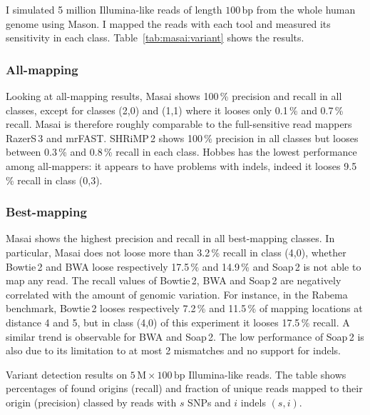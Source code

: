 I simulated 5 million Illumina-like reads of length $100$\,bp from the whole human genome using Mason.
I mapped the reads with each tool and measured its sensitivity in each class.
Table~\ref{tab:masai:variant} shows the results.

\subsubsection{All-mapping}

Looking at all-mapping results, Masai shows 100\,\% precision and recall in all classes, except for classes (2,0) and (1,1) where it looses only 0.1\,\% and 0.7\,\% recall.
Masai is therefore roughly comparable to the full-sensitive read mappers RazerS\,3 and mrFAST.
SHRiMP\,2 shows 100\,\% precision in all classes but looses between 0.3\,\% and 0.8\,\% recall in each class.
Hobbes has the lowest performance among all-mappers: it appears to have problems with indels, indeed it looses 9.5\,\% recall in class (0,3).

\subsubsection{Best-mapping}

Masai shows the highest precision and recall in all best-mapping classes.
In particular, Masai does not loose more than 3.2\,\% recall in class (4,0), whether Bowtie\,2 and BWA loose respectively 17.5\,\% and 14.9\,\% and Soap\,2 is not able to map any read.
The recall values of Bowtie\,2, BWA and Soap\,2 are negatively correlated with the amount of genomic variation.
For instance, in the Rabema benchmark, Bowtie\,2 looses respectively 7.2\,\% and 11.5\,\% of mapping locations at distance 4 and 5, but in class (4,0) of this experiment it looses 17.5\,\% recall.
A similar trend is observable for BWA and Soap\,2.
The low performance of Soap\,2 is also due to its limitation to at most 2 mismatches and no support for indels.

\begin{table*}[tH!]
  \caption[Masai variant detection results]
  {
  \label{tab:masai:variant}
    Variant detection results on $5\,\text{M}\times 100\,\text{bp}$ Illumina-like reads.
    The table shows percentages of found origins (recall) and fraction of unique reads mapped to their origin (precision) classed by reads with $s$ SNPs and $i$ indels $(s,i)$.
  }
  \vspace{-3mm}
  \center
  \sffamily
  \small
  \resizebox{\textwidth}{!}
  {
	\renewcommand{\tabcolsep}{0.8ex}
	
  }
\end{table*}

